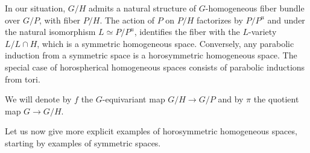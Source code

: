 \documentclass{amsart}
\theoremstyle{definition}
\begin{document}
In our situation, $G/H$ admits a natural structure of $G$-homogeneous 
fiber bundle over $G/P$, with fiber $P/H$. The action of $P$ on $P/H$ 
factorizes by $P/P^u$ and under the natural isomorphism $L\simeq P/P^u$, 
identifies the fiber with the $L$-variety $L/L\cap H$, which is a 
symmetric homogeneous space.
Conversely, any parabolic induction from a symmetric space is a 
horosymmetric homogeneous space. 
The special case of horospherical homogeneous spaces consists of 
parabolic inductions from tori. 

We will denote by $f$ the $G$-equivariant map $G/H \rightarrow G/P$   
and by $\pi$ the quotient map $G\rightarrow G/H$.

Let us now give more explicit examples of horosymmetric homogeneous spaces, 
starting by examples of symmetric spaces.
\end{document}
